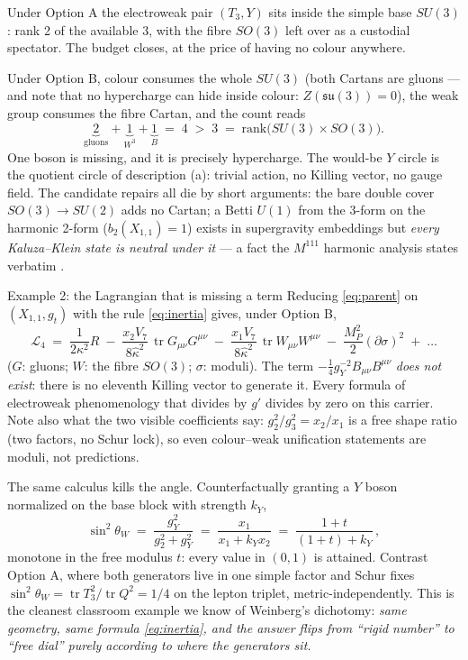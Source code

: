 \documentclass[11pt]{article}
\newcommand{\X}{X_{1,1}}
\newcommand{\tr}{\operatorname{tr}}
\begin{document}
Under Option A the electroweak pair $(T_3, Y)$ sits inside the simple base $SU(3)$: rank 2 of
the available 3, with the fibre $SO(3)$ left over as a custodial spectator. The budget
closes, at the price of having no colour anywhere.

Under Option B, colour consumes the whole $SU(3)$ (both Cartans are gluons --- and note that
no hypercharge can hide inside colour: $Z(\mathfrak{su}(3))=0$), the weak group consumes the
fibre Cartan, and the count reads
\[
\underbrace{2}_{\text{gluons}}+\underbrace{1}_{W^3}+\underbrace{1}_{B}\;=\;4
\;>\;3\;=\;\mathrm{rank}\big(SU(3)\times SO(3)\big).
\]
One boson is missing, and it is precisely hypercharge. The would-be $Y$ circle is the
quotient circle of description (a): trivial action, no Killing vector, no gauge field. The
candidate repairs all die by short arguments: the bare double cover $SO(3)\to SU(2)$ adds no
Cartan; a Betti $U(1)$ from the 3-form on the harmonic 2-form ($b_2(\X)=1$) exists in
supergravity embeddings but \emph{every Kaluza--Klein state is neutral under it} --- a fact
the $M^{111}$ harmonic analysis states verbatim \cite{FabbriFre99}.

\begin{examplebox}{Example 2: the Lagrangian that is missing a term}
Reducing \eqref{eq:parent} on $(\X, g_t)$ with the rule \eqref{eq:inertia} gives, under
Option B,
\[
\mathcal L_4 \;=\; \frac{1}{2\kappa^2}R
\;-\;\frac{x_2 V_7}{8\hat\kappa^2}\,\tr G_{\mu\nu}G^{\mu\nu}
\;-\;\frac{x_1 V_7}{8\hat\kappa^2}\,\tr W_{\mu\nu}W^{\mu\nu}
\;-\;\frac{M_P^2}{2}(\partial\sigma)^2\;+\;\dots
\]
($G$: gluons; $W$: the fibre $SO(3)$; $\sigma$: moduli). The term
$-\frac14 g_Y^{-2}B_{\mu\nu}B^{\mu\nu}$ \emph{does not exist}: there is no eleventh Killing
vector to generate it. Every formula of electroweak phenomenology that divides by $g'$
divides by zero on this carrier. Note also what the two visible coefficients say:
$g_2^2/g_3^2 = x_2/x_1$ is a free shape ratio (two factors, no Schur lock), so even
colour--weak unification statements are moduli, not predictions.
\end{examplebox}

The same calculus kills the angle. Counterfactually granting a $Y$ boson normalized on the
base block with strength $k_Y$,
\begin{equation}
\sin^2\theta_W \;=\; \frac{g_Y^2}{g_2^2+g_Y^2}\;=\;\frac{x_1}{x_1+k_Y x_2}
\;=\;\frac{1+t}{(1+t)+k_Y}\,,
\end{equation}
monotone in the free modulus $t$: every value in $(0,1)$ is attained. Contrast Option A,
where both generators live in one simple factor and Schur fixes
$\sin^2\theta_W=\tr T_3^2/\tr Q^2 = 1/4$ on the lepton triplet, metric-independently. This is
the cleanest classroom example we know of Weinberg's dichotomy: \emph{same geometry, same
formula \eqref{eq:inertia}, and the answer flips from ``rigid number'' to ``free dial''
purely according to where the generators sit.}
\end{document}
